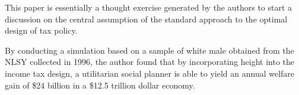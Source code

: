 \documentclass[titlepage]{\econtex}
\begin{document}
This paper is essentially a thought exercise generated by the authors to start a discussion on the central assumption of the standard approach to the optimal design of tax policy.

By conducting a simulation based on a sample of white male obtained from the  NLSY collected in 1996, the author found that by incorporating height into the income tax design, a utilitarian social planner is able to yield an annual welfare gain of \$24 billion in a \$12.5 trillion dollar economy.

\clearpage\vfill\eject

\onlyinsubfile{}
\end{document}
